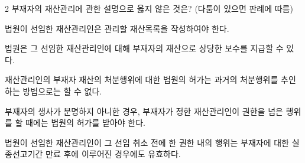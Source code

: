 \begin{question}{2}
부재자의 재산관리에 관한 설명으로 옳지 않은 것은? (다툼이 있으면 판례에 따름)
\begin{choices}
  \item 법원이 선임한 재산관리인은 관리할 재산목록을 작성하여야 한다.
  \item 법원은 그 선임한 재산관리인에 대해 부재자의 재산으로 상당한 보수를 지급할 수 있다.
  \item 재산관리인의 부재자 재산의 처분행위에 대한 법원의 허가는 과거의 처분행위를 추인하는 방법으로는 할 수 없다.
  \item 부재자의 생사가 분명하지 아니한 경우, 부재자가 정한 재산관리인이 권한을 넘은 행위를 할 때에는 법원의 허가를 받아야 한다.
  \item 법원이 선임한 재산관리인이 그 선임 취소 전에 한 권한 내의 행위는 부재자에 대한 실종선고기간 만료 후에 이루어진 경우에도 유효하다.
\end{choices}
\end{question}
